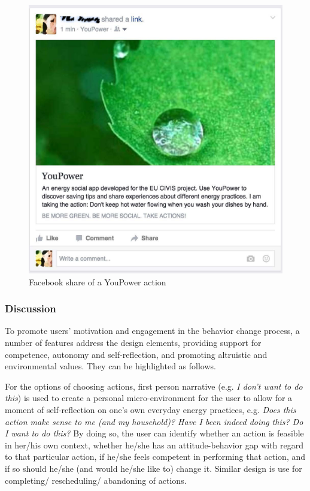 \documentclass[a4paper,10pt]{article}
\begin{document}
\begin{figure}[t!]
\centering
\includegraphics[width=0.55\linewidth]{img/share}
\caption{Facebook share of a YouPower action}
\label{fig:share}
\end{figure}

\subsubsection{Discussion} 
\label{sec:example:motivation:discussions}

To promote users' motivation and engagement in the behavior change process, a number of features address the design elements, providing support for competence, autonomy and self-reflection, and promoting altruistic and environmental values. They can be highlighted as follows.

For the options of choosing actions, first person narrative (e.g. \textit{I don't want to do this}) is used to create a personal micro-environment for the user \citep{Crumlish2009} to allow for a moment of self-reflection on one's own everyday energy practices, e.g. \textit{Does this action make sense to me (and my household)? Have I been indeed doing this? Do I want to do this?} By doing so, the user can identify whether an action is feasible in her/his own context, whether he/she has an attitude-behavior gap with regard to that particular action, if he/she feels competent in performing that action, and if so should he/she (and would he/she like to) change it. Similar design is use for completing/ rescheduling/ abandoning of actions. 
\end{document}
